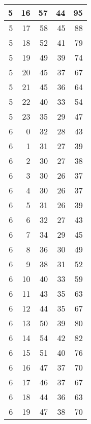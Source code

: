 \begin{longtable}{|r|r|r|r|r|}
    \hline
    5     & 16    & 57    & 44    & 95 \\
    \hline
    5     & 17    & 58    & 45    & 88 \\
    \hline
    5     & 18    & 52    & 41    & 79 \\
    \hline
    5     & 19    & 49    & 39    & 74 \\
    \hline
    5     & 20    & 45    & 37    & 67 \\
    \hline
    5     & 21    & 45    & 36    & 64 \\
    \hline
    5     & 22    & 40    & 33    & 54 \\
    \hline
    5     & 23    & 35    & 29    & 47 \\
    \hline
    6     & 0     & 32    & 28    & 43 \\
    \hline
    6     & 1     & 31    & 27    & 39 \\
    \hline
    6     & 2     & 30    & 27    & 38 \\
    \hline
    6     & 3     & 30    & 26    & 37 \\
    \hline
    6     & 4     & 30    & 26    & 37 \\
    \hline
    6     & 5     & 31    & 26    & 39 \\
    \hline
    6     & 6     & 32    & 27    & 43 \\
    \hline
    6     & 7     & 34    & 29    & 45 \\
    \hline
    6     & 8     & 36    & 30    & 49 \\
    \hline
    6     & 9     & 38    & 31    & 52 \\
    \hline
    6     & 10    & 40    & 33    & 59 \\
    \hline
    6     & 11    & 43    & 35    & 63 \\
    \hline
    6     & 12    & 44    & 35    & 67 \\
    \hline
    6     & 13    & 50    & 39    & 80 \\
    \hline
    6     & 14    & 54    & 42    & 82 \\
    \hline
    6     & 15    & 51    & 40    & 76 \\
    \hline
    6     & 16    & 47    & 37    & 70 \\
    \hline
    6     & 17    & 46    & 37    & 67 \\
    \hline
    6     & 18    & 44    & 36    & 63 \\
    \hline
    6     & 19    & 47    & 38    & 70 \\

\end{longtable}
